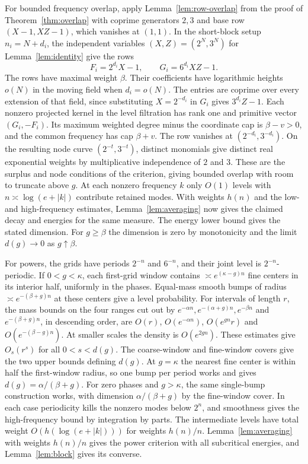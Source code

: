 \documentclass[11pt,a4paper,reqno]{amsart}
\theoremstyle{definition}
\theoremstyle{remark}
\numberwithin{equation}{section}
\begin{document}
For bounded frequency overlap, apply Lemma~\ref{lem:row-overlap}
from the proof of Theorem~\ref{thm:overlap} with coprime generators
$2,3$ and base row $(X-1,XZ-1)$, which vanishes at $(1,1)$.
In the short-block setup $n_i=N+d_i$, the independent variables
$(X,Z)=(2^N,3^N)$ for Lemma~\ref{lem:identity} give the rows
\[
 F_i=2^{d_i}X-1,\qquad G_i=6^{d_i}XZ-1.
\]
The rows have maximal weight $\beta$. Their coefficients have
logarithmic heights $o(N)$ in the moving field when $d_i=o(N)$.
The entries are coprime over every extension of that field, since
substituting $X=2^{-d_i}$ in $G_i$ gives
$3^{d_i}Z-1$. Each nonzero projected kernel in the level filtration
has rank one and primitive vector $(G_i,-F_i)$. Its maximum weighted
degree minus the coordinate cap is $\beta-v>0$, and the common
frequency has cap $\beta+v$. The row vanishes at
$(2^{-d_i},3^{-d_i})$. On the resulting node curve
$(2^{-t},3^{-t})$, distinct monomials give distinct real exponential
weights by multiplicative independence of $2$ and $3$. These are the
surplus and node conditions of the criterion, giving bounded overlap
with room to truncate above $g$. At each nonzero frequency $k$ only
$O(1)$ levels with $n\asymp\log(e+|k|)$ contribute retained modes.
With weights $h(n)$ and the low- and high-frequency estimates,
Lemma~\ref{lem:averaging} now gives the claimed decay and energies for
the same measure. The energy lower bound gives the stated dimension.
For $g\ge\beta$ the dimension is zero by monotonicity and the limit
$d(g)\to0$ as $g\uparrow\beta$.

For powers, the grids have periods $2^{-n}$ and $6^{-n}$, and their
joint level is $2^{-n}$-periodic. If $0<g<\kappa$, each first-grid
window contains $\asymp e^{(\kappa-g)n}$ fine centers in its interior
half, uniformly in the phases. Equal-mass smooth bumps of radius
$\asymp e^{-(\beta+g)n}$ at these centers give a level probability.
For intervals of length $r$, the mass bounds on the four ranges cut
out by $e^{-\alpha n},e^{-(\alpha+g)n},e^{-\beta n}$ and
$e^{-(\beta+g)n}$, in descending order, are
$O(r)$, $O(e^{-\alpha n})$, $O(e^{gn}r)$ and $O(e^{-(\beta-g)n})$.
At smaller scales the density is $O(e^{2gn})$. These estimates give
$O_s(r^s)$ for all $0<s<d(g)$. The coarse-window and fine-window
covers give the two upper bounds defining $d(g)$. At $g=\kappa$ the
nearest fine center is within half the first-window radius, so one
bump per period works and gives $d(g)=\alpha/(\beta+g)$. For zero
phases and $g>\kappa$, the same single-bump construction works, with
dimension $\alpha/(\beta+g)$ by the fine-window cover. In each case
periodicity kills the nonzero modes below $2^n$, and smoothness gives
the high-frequency bound by integration by parts. The intermediate
levels have total weight $O(h(\log(e+|k|)))$ for weights $h(n)/n$.
Lemma~\ref{lem:averaging}
with weights $h(n)/n$ gives the power criterion with all subcritical
energies, and Lemma~\ref{lem:block} gives its converse.
\end{document}
